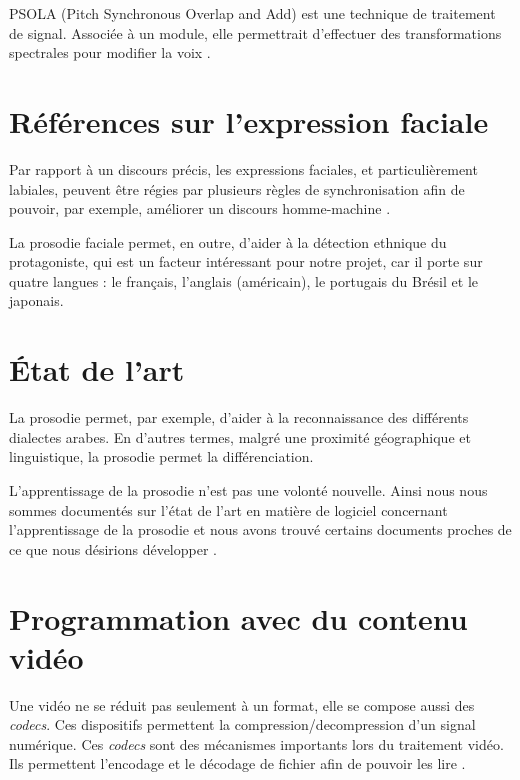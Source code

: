 PSOLA (Pitch Synchronous Overlap and Add) est une technique de traitement de signal. Associée à un module, elle permettrait d'effectuer des transformations spectrales pour modifier la voix \cite{valbret1992voice}.

\section{Références sur l'expression faciale}\label{ref_transfo_faciales}

Par rapport à un discours précis, les expressions faciales, et particulièrement labiales, peuvent être régies par plusieurs règles de synchronisation afin de pouvoir, par exemple, améliorer un discours homme-machine \cite{beskow1995rule} .

La prosodie faciale permet, en outre, d'aider à la détection ethnique du protagoniste, qui est un facteur intéressant pour notre projet, car il porte sur quatre langues : le français, l'anglais (américain), le portugais du Brésil et le japonais\cite{matsumoto1992american}.


\section{État de l'art}\label{state_of_the_art}

La prosodie permet, par exemple, d'aider à la reconnaissance des différents dialectes arabes. En d'autres termes, malgré une proximité géographique et linguistique, la prosodie permet la différenciation\cite{rouas2006identification}.

L'apprentissage de la prosodie n'est pas une volonté nouvelle. Ainsi nous nous sommes documentés sur l'état de l'art en matière de logiciel concernant l'apprentissage de la prosodie et nous avons trouvé certains documents proches de ce que nous désirions développer \cite{10.4000/alsic.332}. 

\section{Programmation avec du contenu vidéo}

Une vidéo ne se réduit pas seulement à un format, elle se compose aussi des \textit{codecs}. Ces dispositifs permettent la compression/decompression d'un signal numérique. Ces \textit{codecs} sont des mécanismes importants lors du traitement vidéo. Ils permettent l'encodage et le décodage de fichier afin de pouvoir les lire \cite{ghanbari1999video} \cite{he2013introduction}.
